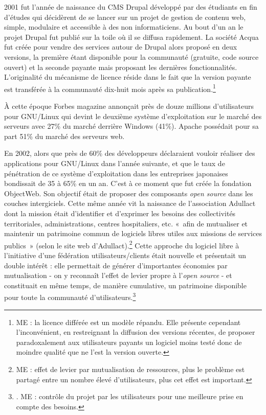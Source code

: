 \documentclass{FramateX}
\begin{document}
\begin{refsection}
2001 fut l'année de naissance du CMS Drupal développé par des étudiants
en fin d'études qui décidèrent de se lancer sur un projet de gestion de
contenu web, simple, modulaire et accessible à des non informaticiens.
Au bout d'un an le projet Drupal fut publié sur la toile où il se
diffusa rapidement. La société Acqua fut créée pour vendre des services
autour de Drupal alors proposé en deux versions, la première étant
disponible pour la communauté (gratuite, code source ouvert) et la
seconde payante mais proposant les dernières fonctionnalités.
L'originalité du mécanisme de licence réside dans le fait que la
version payante est transférée à la communauté dix-huit mois après sa
publication.\footnote{ME : la licence différée est un modèle répandu.
Elle présente cependant l'inconvénient, en
restreignant la diffusion des versions récentes, de proposer
paradoxalement aux utilisateurs payants un logiciel moins testé donc de
moindre qualité que ne l'est la version ouverte.}

À cette époque Forbes magazine annonçait près de douze millions
d'utilisateurs pour GNU/Linux qui devint le deuxième système
d'exploitation sur le marché des serveurs avec 27\% du marché derrière
Windows (41\%). Apache possédait pour sa part 51\% du marché des
serveurs web.

En 2002, alors que près de 60\% des développeurs déclaraient vouloir
réaliser des applications pour GNU/Linux dans l'année suivante, et que
le taux de pénétration de ce système d'exploitation
dans les entreprises japonaises bondissait de 35 à 65\% en un an.
C'est à ce moment que fut créée la fondation
ObjectWeb. Son objectif était de proposer des composants \textit{open
source} dans les couches intergiciels. Cette même année vit la
naissance de l'association Adullact dont la mission était d'identifier
et d'exprimer les besoins des collectivités territoriales,
administrations, centres hospitaliers, etc. «~afin de mutualiser et
maintenir un patrimoine commun de logiciels libres utiles aux missions
de services publics~» (selon le site web
d'Adullact).\footnote{ME : effet de levier par
mutualisation de ressources, plus le problème est partagé entre un
nombre élevé d'utilisateurs, plus cet effet est
important.} Cette approche du logiciel libre à l'initiative d'une
fédération utilisateurs/clients était nouvelle et présentait un double
intérêt : elle permettait de générer d'importantes
économies par mutualisation - on y reconnaît l'effet de levier propre à
l'\textit{open source} - et constituait en même temps, de manière
cumulative, un patrimoine disponible pour toute la communauté
d'utilisateurs.\footnote{\cite{eliecloud2011}. ME : contrôle du projet par les
utilisateurs pour une meilleure prise en compte des besoins.}


\end{refsection}
\end{document}
